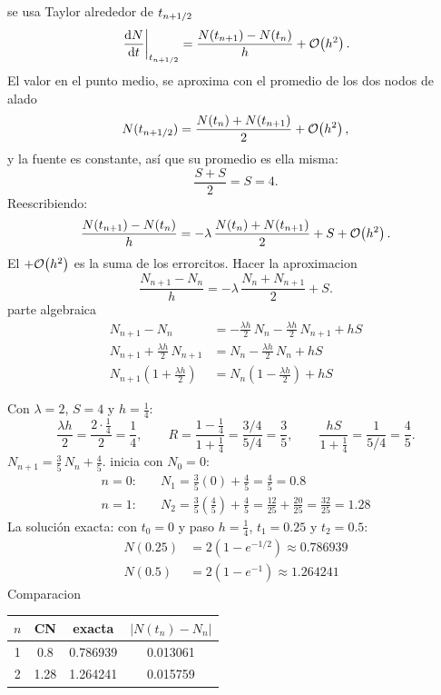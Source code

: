 se usa Taylor alrededor de $t_{n+1/2}$
\[
\left.\frac{\mathrm{d} N}{\mathrm{d} t}\right|_{t_{n+1/2}} = \frac{N(t_{n+1}) - N(t_n)}{h} + \mathcal{O}\!\left(h^2\right).
\]
El valor en el punto medio, se aproxima con el promedio de los dos nodos de alado
\[
N(t_{n+1/2}) = \frac{N(t_n) + N(t_{n+1})}{2} + \mathcal{O}\!\left(h^2\right),
\]
y la fuente es constante, así que su promedio es ella misma:
\[
\frac{S + S}{2} = S = 4 .
\]
Reescribiendo:
\[
\frac{N(t_{n+1}) - N(t_n)}{h} = -\lambda\,\frac{N(t_n) + N(t_{n+1})}{2} + S + \mathcal{O}\!\left(h^2\right).
\]
El $+\mathcal{O}\!\left(h^2\right)$ es la suma de los errorcitos.
Hacer la aproximacion
\[
\frac{N_{n+1} - N_n}{h} = -\lambda\,\frac{N_n + N_{n+1}}{2} + S .
\]
parte algebraica
\begin{align*}
	N_{n+1} - N_n &= -\frac{\lambda h}{2}\,N_n - \frac{\lambda h}{2}\,N_{n+1} + hS\\
	N_{n+1} + \frac{\lambda h}{2}\,N_{n+1} &= N_n - \frac{\lambda h}{2}\,N_n + hS\\
	N_{n+1}\left(1 + \frac{\lambda h}{2}\right) &= N_n\left(1 - \frac{\lambda h}{2}\right) + hS
\end{align*}

Con $\lambda = 2$, $S = 4$ y $h = \frac14$:
\[
\frac{\lambda h}{2} = \frac{2\cdot\frac14}{2} = \frac14, \qquad
R = \frac{1 - \frac14}{1 + \frac14} = \frac{3/4}{5/4} = \frac35, \qquad
\frac{hS}{1 + \frac14} = \frac{1}{5/4} = \frac45 .
\]
$N_{n+1} = \frac35\,N_n + \frac45$. inicia con $N_0 = 0$:
\begin{align*}
	n = 0:&\quad N_1 = \tfrac35(0) + \tfrac45 = \tfrac45 = 0.8\\
	n = 1:&\quad N_2 = \tfrac35\left(\tfrac45\right) + \tfrac45 = \tfrac{12}{25} + \tfrac{20}{25} = \tfrac{32}{25} = 1.28
\end{align*}
La solución exacta: con $t_0 = 0$ y paso $h = \frac14$, $t_1 = 0.25$ y $t_2 = 0.5$:
\begin{align*}
	N(0.25) &= 2\left(1 - e^{-1/2}\right) \approx 0.786939\\
	N(0.5)  &= 2\left(1 - e^{-1}\right) \approx 1.264241
\end{align*}
Comparacion
\begin{center}
	\begin{tabular}{cccc}\toprule
		$n$ & CN & exacta & $|N(t_n) - N_n|$\\\midrule
		1 & 0.8  & 0.786939 & 0.013061\\
		2 & 1.28 & 1.264241 & 0.015759\\\bottomrule
	\end{tabular}
\end{center}

